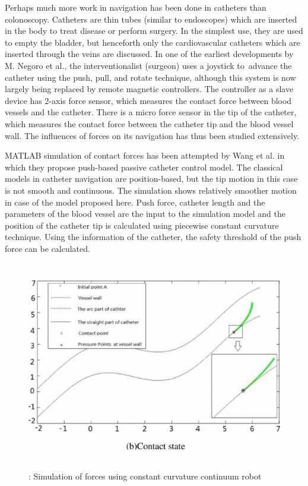 \documentclass[12pt]{report}
\begin{document}
Perhaps much more work in navigation has been done in catheters than colonoscopy. Catheters are thin tubes (similar to endoscopes) which are inserted in the body to treat disease or perform surgery. In the simplest use, they are used to empty the bladder, but henceforth only the cardiovascular catheters which are inserted through the veins are discussed. In one of the earliest developments by M. Negoro et al.\cite{Negoro2001AnIC}, the interventionalist (surgeon) uses a joystick to advance the catheter using the push, pull, and rotate technique, although this system is now largely being replaced by remote magnetic controllers. The controller as a slave device has 2-axis force sensor, which measures the contact force between blood vessels and the catheter. There is a micro force sensor in the tip of the catheter, which measures the contact force between the catheter tip and the blood vessel wall. The influences of forces on its navigation has thus been studied extensively.\par

MATLAB simulation of contact forces has been attempted by Wang et al.\cite{6885827} in which they propose push-based passive catheter control model. The classical models in catheter navigation are position-based, but the tip motion in this case is not smooth and continuous. The simulation shows relatively smoother motion in case of the model proposed here. Push force, catheter length and the parameters of the blood vessel are the input to the simulation model and the position of the catheter tip is calculated using piecewise constant curvature technique. Using the information of the catheter, the safety threshold of the push force can be calculated.\par




\begin{figure}[H]
	\begin{Center}
		\includegraphics[width=5.73in,height=3.59in]{./media/image4.gif}
		\caption{: Simulation of forces using constant curvature continuum robot}
		\label{fig:_Simulation_of_forces_using_constant_curvature_continuum_robot}
	\end{Center}
\end{figure}
\end{document}
